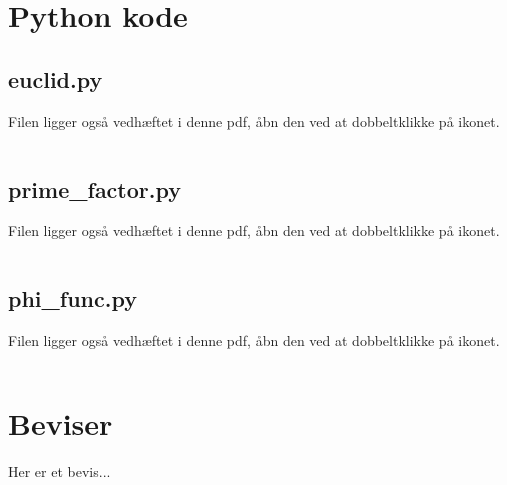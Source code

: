 \section{Python kode}
\subsection{euclid.py}
\label{file:euclid}
Filen ligger også vedhæftet i denne pdf, åbn den ved at dobbeltklikke på ikonet.
\inputminted[python3, linenos, breaklines, frame=lines, fontsize=\footnotesize]{python}{src/euclid.py}


\subsection{prime\_factor.py}
\label{file:prime_factor}
Filen ligger også vedhæftet i denne pdf, åbn den ved at dobbeltklikke på ikonet.
\inputminted[python3, linenos, breaklines, frame=lines, fontsize=\footnotesize]{python}{src/prime_factor.py}


\subsection{phi\_func.py}
\label{file:phi_func}
Filen ligger også vedhæftet i denne pdf, åbn den ved at dobbeltklikke på ikonet.
\inputminted[python3, linenos, breaklines, frame=lines, fontsize=\footnotesize]{python}{src/phi_func.py}


\section{Beviser}
Her er et bevis...
